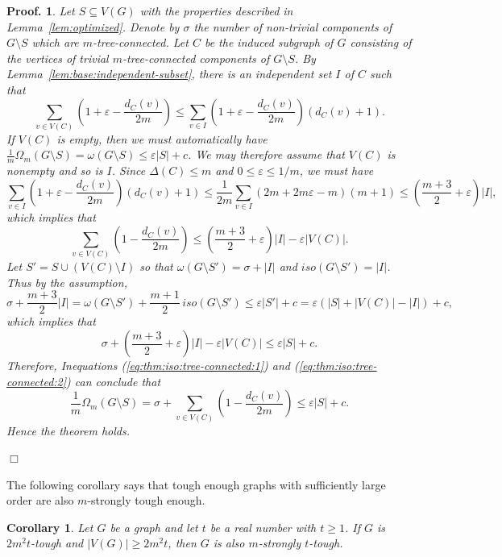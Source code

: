 \documentclass[10pt,bezier]{article}
\newtheorem{precor}[prethm]{{\bf Corollary}}
\newenvironment{cor}{\begin{precor}{\hspace{-0.5
em}{\bf.}}}{\end{precor}}
\newtheorem{preproof}{{\bf Proof.}}
\newenvironment{proof}[1]{\begin{preproof}{\rm
#1}\hfill{$\Box$}}{\end{preproof}}
\begin{document}
%
\begin{proof}{
Let $S\subseteq V(G)$ with the properties described in Lemma~\ref{lem:optimized}.
Denote by $\sigma$ the number of non-trivial components of $G\setminus S$ which are $m$-tree-connected.
Let $C$ be the induced subgraph of $G$ consisting of the vertices of trivial $m$-tree-connected components of $G\setminus S$.
%
By Lemma~\ref{lem:base:independent-subset}, there is an independent set $I$ of $C$ 
such that 
%
$$\sum_{v\in V(C)}(1+\varepsilon-\frac{d_C(v)}{2m})\le 
\sum_{v\in I}(1+\varepsilon-\frac{d_C(v)}{2m})(d_C(v)+1).
$$
%
If $V(C)$ is empty, then we must automatically have 
$\frac{1}{m}\Omega_m(G\setminus S)= \omega (G\setminus S) \le \varepsilon |S|+c$.
We may therefore assume that $V(C)$ is nonempty and so is $I$. 
%
Since $\Delta(C)\le m$ and $ 0\le \varepsilon \le 1/m$, we must have 
\begin{equation*}
{\sum_{v\in I}(1+\varepsilon- \frac{d_C(v)}{2m})(d_C(v)+1)\le 
\frac{1}{2m}\sum_{v\in I}(2m+2m\varepsilon-m)(m+1)\le (\frac{m+3}{2}+\varepsilon)|I|,
}\end{equation*}
%
which implies that 
\begin{equation}\label{eq:thm:iso:tree-connected:1}
{\sum_{v\in V(C)}(1-\frac{d_C(v)}{2m}) \le (\frac{m+3}{2}+\varepsilon)|I|-\varepsilon|V(C)| .
}\end{equation}
%
Let $S'=S\cup (V(C)\setminus I)$ so that 
$\omega(G\setminus S') =\sigma+|I|$ and $iso(G\setminus S') =|I|$.
%
Thus by the assumption, 
%
$$
\sigma+\frac{m+3}{2}|I|= 
\omega(G\setminus S')+ \frac{m+1}{2}\, iso(G\setminus S')\le
 \varepsilon |S'|+c = \varepsilon (|S|+|V(C)|-|I|)+c,
$$
which implies that 
\begin{equation}\label{eq:thm:iso:tree-connected:2}
{\sigma+(\frac{m+3}{2}+\varepsilon)|I|-\varepsilon |V(C)| 
\le \varepsilon |S|+c.
}\end{equation}
%
%
Therefore, 
Inequations (\ref{eq:thm:iso:tree-connected:1}) and (\ref{eq:thm:iso:tree-connected:2}) can conclude that
$$\frac{1}{m}\Omega_m(G\setminus S)= 
%
 \sigma+\sum_{v\in V(C)}(1-\frac{d_C(v)}{2m})\le
\varepsilon|S|+c.$$
Hence the theorem holds.
%
}\end{proof}
%
The following corollary says that tough enough graphs with sufficiently large
order are also $m$-strongly tough enough.
%
\begin{cor}\label{cor:tough-enough}
{Let $G$ be a graph and let $t$ be a real number with $t\ge 1$. 
If $G$ is $2m^2t$-tough and $|V(G)|\ge 2m^2 t$, 
then $G$ is also $m$-strongly $t$-tough.
}\end{cor}
\end{document}
